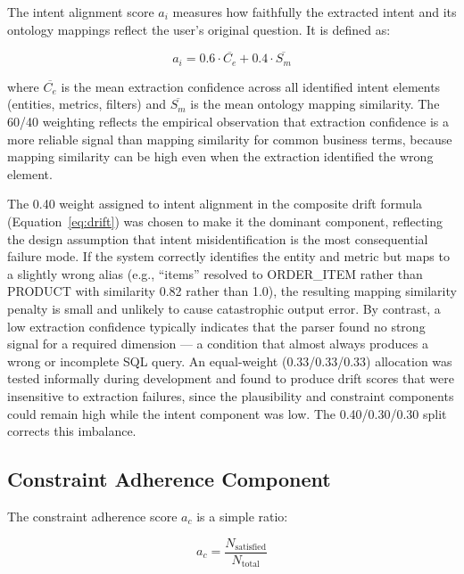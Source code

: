\documentclass[12pt,a4paper]{report}
\begin{document}
The intent alignment score $a_i$ measures how faithfully the extracted intent and its ontology mappings reflect the user's original question. It is defined as:

\begin{equation}
  a_i = 0.6 \cdot \overline{C_e} + 0.4 \cdot \overline{S_m}
  \label{eq:intent-alignment}
\end{equation}

where $\overline{C_e}$ is the mean extraction confidence across all identified intent elements (entities, metrics, filters) and $\overline{S_m}$ is the mean ontology mapping similarity. The 60/40 weighting reflects the empirical observation that extraction confidence is a more reliable signal than mapping similarity for common business terms, because mapping similarity can be high even when the extraction identified the wrong element.

The 0.40 weight assigned to intent alignment in the composite drift formula (Equation~\ref{eq:drift}) was chosen to make it the dominant component, reflecting the design assumption that intent misidentification is the most consequential failure mode. If the system correctly identifies the entity and metric but maps to a slightly wrong alias (e.g., ``items'' resolved to ORDER\_ITEM rather than PRODUCT with similarity 0.82 rather than 1.0), the resulting mapping similarity penalty is small and unlikely to cause catastrophic output error. By contrast, a low extraction confidence typically indicates that the parser found no strong signal for a required dimension — a condition that almost always produces a wrong or incomplete \ac{SQL} query. An equal-weight (0.33/0.33/0.33) allocation was tested informally during development and found to produce drift scores that were insensitive to extraction failures, since the plausibility and constraint components could remain high while the intent component was low. The 0.40/0.30/0.30 split corrects this imbalance.

\subsection{Constraint Adherence Component}
\label{subsec:constraint-adherence}

The constraint adherence score $a_c$ is a simple ratio:

\begin{equation}
  a_c = \frac{N_{\text{satisfied}}}{N_{\text{total}}}
  \label{eq:constraint}
\end{equation}
\end{document}
